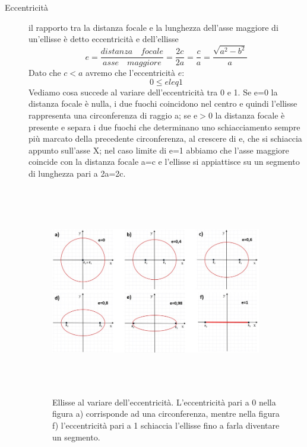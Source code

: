 \begin{description}
\item [Eccentricità] il rapporto tra la distanza focale e la lunghezza 
dell'asse maggiore di un'ellisse è detto eccentricità e dell'ellisse
\begin{equation}
e=\dfrac{distanza \quad focale}{asse\quad 
maggiore}=\dfrac{2c}{2a}=\dfrac{c}{a}=\dfrac{\sqrt{a^{2}-b^{2}}}{a}
\end{equation}
Dato che \(c<a\) avremo che l'eccentricità \(e\):
\[0 \leq e leq 1\]
Vediamo cosa succede al variare dell'eccentricità tra 0 e 1.
Se e=0 la distanza focale è nulla, i due fuochi coincidono nel centro e 
quindi l'ellisse rappresenta una circonferenza di raggio a; se e$ > $0 la 
distanza focale è presente e separa i due fuochi che determinano uno 
schiacciamento sempre più marcato della precedente circonferenza, al 
crescere di e, che si schiaccia appunto sull'asse X; nel caso limite di e=1 
abbiamo che l'asse maggiore coincide con la distanza focale a=c e l'ellisse 
si appiattisce su un segmento di lunghezza pari a 2a=2c.
\begin{figure}[h]
  \centering%
  \includegraphics[height=9.2cm, width=9.2cm, keepaspectratio] 
{img/eccentricita.jpg}%
  \caption{Ellisse al variare dell'eccentricità. L'eccentricità pari 
a 0 nella figura a) corrisponde ad una circonferenza, mentre nella figura 
f) l'eccentricità pari a 1 schiaccia l'ellisse fino a farla diventare un 
segmento.}%
\end{figure}
\end{description}

